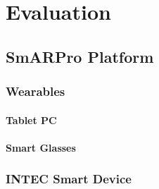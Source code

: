 \chapter{Evaluation}

\section{SmARPro  Platform}

\subsection{Wearables}

\subsubsection{Tablet PC}
\subsubsection{Smart Glasses}

\subsection{INTEC Smart Device}




